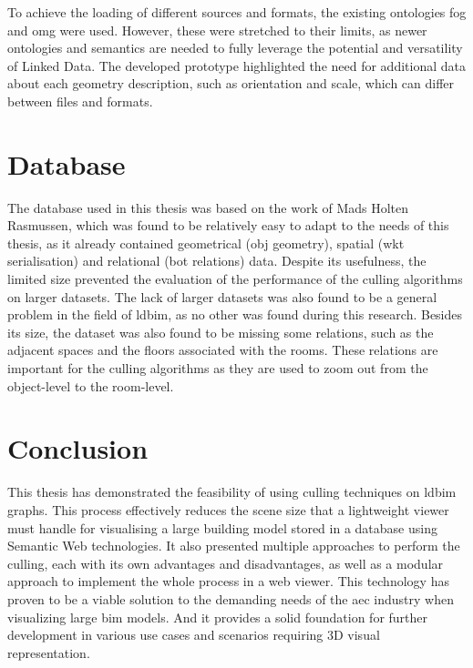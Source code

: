 To achieve the loading of different sources and formats, the existing ontologies \ac{fog} and \ac{omg} were used. However, these were stretched to their limits, as newer ontologies and semantics are needed to fully leverage the potential and versatility of Linked Data. The developed prototype highlighted the need for additional data about each geometry description, such as orientation and scale, which can differ between files and formats.

\section{Database}
The database used in this thesis was based on the work of Mads Holten Rasmussen, which was found to be relatively easy to adapt to the needs of this thesis, as it already contained geometrical (obj geometry), spatial (\ac{wkt} serialisation) and relational (\ac{bot} relations) data. Despite its usefulness, the limited size prevented the evaluation of the performance of the culling algorithms on larger datasets. The lack of larger datasets was also found to be a general problem in the field of \ac{ldbim}, as no other was found during this research. Besides its size, the dataset was also found to be missing some relations, such as the adjacent spaces and the floors associated with the rooms. These relations are important for the culling algorithms as they are used to zoom out from the object-level to the room-level.

\section{Conclusion}
This thesis has demonstrated the feasibility of using culling techniques on \ac{ldbim} graphs. This process effectively reduces the scene size that a lightweight viewer must handle for visualising a large building model stored in a database using Semantic Web technologies. It also presented multiple approaches to perform the culling, each with its own advantages and disadvantages, as well as a modular approach to implement the whole process in a web viewer. This technology has proven to be a viable solution to the demanding needs of the \ac{aec} industry when visualizing large \ac{bim} models. And it provides a solid foundation for further development in various use cases and scenarios requiring 3D visual representation.